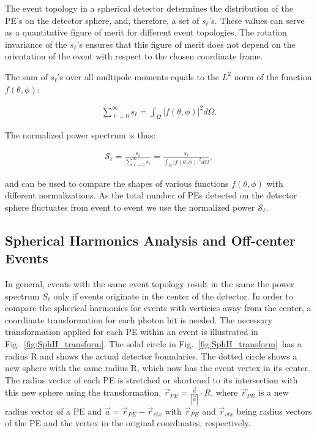 The event topology in a spherical detector determines the distribution
of the PE's on the detector sphere, and, therefore, a set of
$s_{\ell}$'s. These values can serve as a quantitative figure of merit for
different event topologies. The rotation invariance of the $s_{\ell}$'s ensures
that this figure of merit does not depend on the orientation of the
event with respect to the chosen coordinate frame.

The sum of $s_{\ell}$'s over all multipole moments equals to the $L^2$ norm of the
function $f(\theta,\phi)$:

\begin{eqnarray}
\label{eq5}
\sum_{\ell=0}^{\infty} s_{\ell} = \int_{\Omega} |f(\theta,\phi)|^2 d\Omega.
\end{eqnarray}

The normalized power spectrum is thus:

\begin{eqnarray}
\label{eq6}
\mathcal{S}_{\ell} = \frac{s_{\ell}}{\sum_{\ell=0}^{\infty} s_{\ell}} =  \frac{s_{\ell}}{\int_{\Omega} |f(\theta,\phi)|^2 d\Omega},
\end{eqnarray}

and can be used to compare the shapes of various functions
$f(\theta,\phi)$ with different normalizations. As the total number of
PEs detected on the detector sphere fluctuates from event to event we
use the normalized power $\mathcal{S}_{\ell}$.


\subsection{Spherical Harmonics Analysis and Off-center Events}

In general, events with the same event topology result in the same
the power spectrum $S_{\ell}$ only if events originate in the center 
of the detector. In
order to compare the spherical harmonics for events with verticies away
from the center, a coordinate transformation for each photon hit is
needed. The necessary transformation applied for each PE within an
event is illustrated in Fig.~\ref{fig:SphH_transform}.  The solid
circle in Fig.~\ref{fig:SphH_transform}~has a radius R and shows the
actual detector boundaries. The dotted circle shows a new sphere with
the same radius R, which now has the event vertex in its center. The
radius vector of each PE is stretched or shortened to its intersection
with this new sphere using the transformation, $\vec{r}^{,}_{PE} =
\frac{\vec{a}}{|\vec{a}|} \cdot R$, where $\vec{r}^{,}_{PE}$ is a new
radius vector of a PE and $\vec{a}=\vec{r}_{PE} - \vec{r}_{vtx}$ with
$\vec{r}_{PE}$ and $\vec{r}_{vtx}$ being radius vectors of the PE and
the vertex in the original coordinates, respectively.


